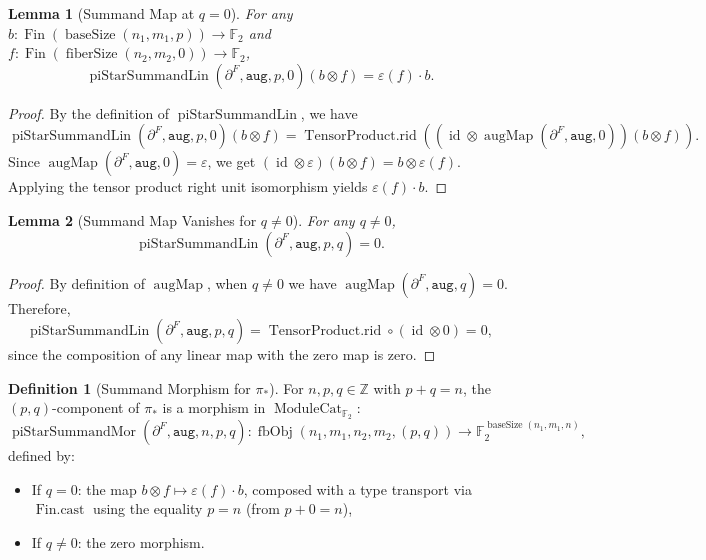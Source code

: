 \documentclass[11pt]{article}
\theoremstyle{plain}
\newtheorem*{lemma}{Lemma}
\theoremstyle{definition}
\newtheorem*{definition}{Definition}
\theoremstyle{remark}
\begin{document}
\begin{lemma}[Summand Map at $q = 0$]
For any $b : \operatorname{Fin}(\operatorname{baseSize}(n_1,m_1,p)) \to \mathbb{F}_2$ and $f : \operatorname{Fin}(\operatorname{fiberSize}(n_2,m_2,0)) \to \mathbb{F}_2$,
\[
\operatorname{piStarSummandLin}(\partial^F, \mathtt{aug}, p, 0)(b \otimes f) = \varepsilon(f) \cdot b.
\]
\end{lemma}

\begin{proof}
By the definition of $\operatorname{piStarSummandLin}$, we have
\[
\operatorname{piStarSummandLin}(\partial^F, \mathtt{aug}, p, 0)(b \otimes f) = \operatorname{TensorProduct.rid}((\operatorname{id} \otimes \operatorname{augMap}(\partial^F, \mathtt{aug}, 0))(b \otimes f)).
\]
Since $\operatorname{augMap}(\partial^F, \mathtt{aug}, 0) = \varepsilon$, we get $(\operatorname{id} \otimes \varepsilon)(b \otimes f) = b \otimes \varepsilon(f)$. Applying the tensor product right unit isomorphism yields $\varepsilon(f) \cdot b$.
\end{proof}

\begin{lemma}[Summand Map Vanishes for $q \neq 0$]
For any $q \neq 0$,
\[
\operatorname{piStarSummandLin}(\partial^F, \mathtt{aug}, p, q) = 0.
\]
\end{lemma}

\begin{proof}
By definition of $\operatorname{augMap}$, when $q \neq 0$ we have $\operatorname{augMap}(\partial^F, \mathtt{aug}, q) = 0$. Therefore,
\[
\operatorname{piStarSummandLin}(\partial^F, \mathtt{aug}, p, q) = \operatorname{TensorProduct.rid} \circ (\operatorname{id} \otimes 0) = 0,
\]
since the composition of any linear map with the zero map is zero.
\end{proof}

\begin{definition}[Summand Morphism for $\pi_*$]
For $n, p, q \in \mathbb{Z}$ with $p + q = n$, the $(p,q)$-component of $\pi_*$ is a morphism in $\operatorname{ModuleCat}_{\mathbb{F}_2}$:
\[
\operatorname{piStarSummandMor}(\partial^F, \mathtt{aug}, n, p, q) :
\operatorname{fbObj}(n_1,m_1,n_2,m_2,(p,q))
\longrightarrow
\mathbb{F}_2^{\operatorname{baseSize}(n_1,m_1,n)},
\]
defined by:
\begin{itemize}
\item If $q = 0$: the map $b \otimes f \mapsto \varepsilon(f) \cdot b$, composed with a type transport via $\operatorname{Fin.cast}$ using the equality $p = n$ (from $p + 0 = n$),
\item If $q \neq 0$: the zero morphism.
\end{itemize}
\end{definition}
\end{document}
